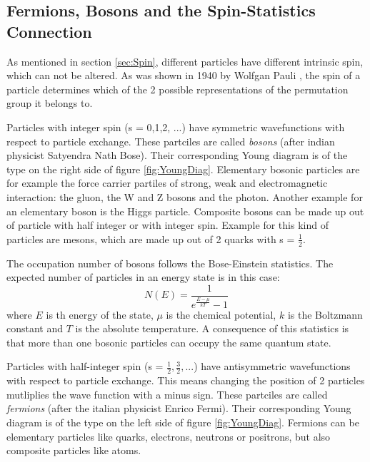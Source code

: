 \subsection{Fermions, Bosons and the Spin-Statistics Connection}

As mentioned in section \ref{sec:Spin}, different particles have different intrinsic spin, which can not be altered. As was shown in 1940 by Wolfgan Pauli \cite{Pauli1940}, the spin of a particle determines which of the 2 possible representations of the permutation group it belongs to. 

Particles with integer spin (s = 0,1,2, ...) have symmetric wavefunctions with respect to particle exchange. These partciles are called \textit{bosons} (after indian physicist Satyendra Nath Bose). Their corresponding Young diagram is of the type on the right side of figure \ref{fig:YoungDiag}. Elementary bosonic particles are for example the force carrier partiles of strong, weak and electromagnetic interaction: the gluon, the W and Z bosons and the photon. Another example for an elementary boson is the Higgs particle. Composite bosons can be made up out of particle with half integer or with integer spin. Example for this kind of particles are mesons, which are made up out of 2 quarks with s = $\frac{1}{2}$. 

The occupation number of bosons follows the Bose-Einstein statistics. The expected number of particles in an energy state is in this case:
\begin{equation}
 N(E) = \frac{1}{e^{\frac{E-\mu}{kT}}-1}
\end{equation} 
where $E$ is th energy of the state, $\mu$ is the chemical potential, $k$ is the Boltzmann constant and $T$ is the absolute temperature. A consequence of this statistics is that more than one bosonic particles can occupy the same quantum state. 

Particles with half-integer spin (s = $\frac{1}{2},\frac{3}{2},...$) have antisymmetric wavefunctions with respect to particle exchange. This means changing the position of 2 particles mutliplies the wave function with a minus sign. These partciles are called \textit{fermions} (after the italian physicist Enrico Fermi). Their corresponding Young diagram is of the type on the left side of figure \ref{fig:YoungDiag}. Fermions can be elementary particles like quarks, electrons, neutrons or positrons, but also composite particles like atoms. 

